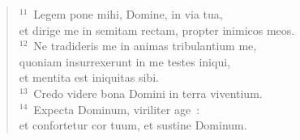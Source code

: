 \begin{flushleft}
\begin{verse}
${}^{11}$~Legem pone mihi, Domine, in via tua,\\ et dirige me in semitam rectam, propter inimicos meos.\\
${}^{12}$~Ne tradideris me in animas tribulantium me,\\ quoniam insurrexerunt in me testes iniqui,\\ et mentita est iniquitas sibi.\\
${}^{13}$~Credo videre bona Domini in terra viventium.\\
${}^{14}$~Expecta Dominum, viriliter age~:\\ et confortetur cor tuum, et sustine Dominum.\end{verse}\end{flushleft}




